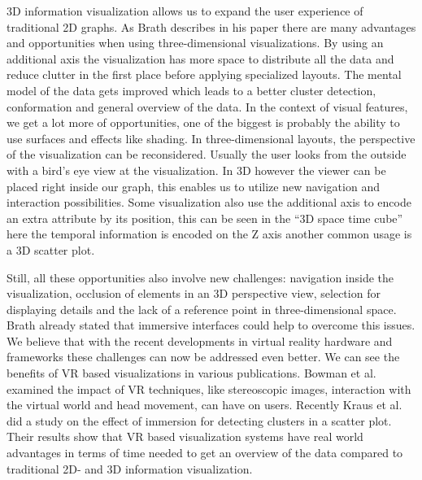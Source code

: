 3D information visualization allows us to expand the user experience of traditional 2D graphs. As Brath describes in his paper \cite{brath_3d_2014} there are many advantages and opportunities when using three-dimensional visualizations.
By using an additional axis the visualization has more space to distribute all the data and reduce clutter in the first place before applying specialized layouts. The mental model of the data gets improved which leads to a better cluster detection, conformation and general overview of the data.
In the context of visual features, we get a lot more of opportunities, one of the biggest is probably the ability to use surfaces and effects like shading. 
In three-dimensional layouts, the perspective of the visualization can be reconsidered. Usually the user looks from the outside with a bird's eye view at the visualization. In 3D however the viewer can be placed right inside our graph, this enables us to utilize new navigation and interaction possibilities. Some visualization also use the additional axis to encode an extra attribute by its position, this can be seen in the “3D space time cube” \cite{brath_3d_2014} here the temporal information is encoded on the Z axis another common usage is a 3D scatter plot. 

Still, all these opportunities also involve new challenges: navigation inside the visualization, occlusion of elements in an 3D perspective view, selection for displaying details and the lack of a reference point in three-dimensional space. Brath \cite{brath_3d_2014} already stated that immersive interfaces could help to overcome this issues.
 We believe that with the recent developments in virtual reality hardware and frameworks these challenges can now be addressed even better. 
 We can see the benefits of VR based visualizations in various publications. Bowman et al. \cite{bowman_virtual_2007} examined the impact of VR techniques, like stereoscopic images, interaction with the virtual world and head movement, can have on users. 
 Recently Kraus et al. \cite{kraus_impact_2020} did a study on the effect of immersion for detecting clusters in a scatter plot. Their results show that VR based visualization systems have real world advantages in terms of time needed to get an overview of the data compared to traditional 2D- and 3D information visualization. 
 

